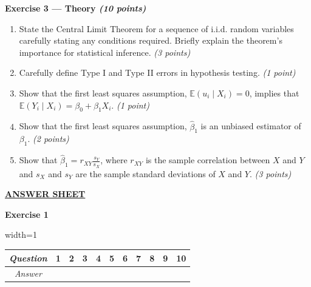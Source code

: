 \documentclass{article}
\begin{document}
\vspace{1cm}
\textbf{Exercise 3 --- Theory \textit{(10 points)}} \\[1em]

\begin{enumerate}[label=\alph*)]

\item State the Central Limit Theorem for a sequence of i.i.d. random
variables carefully stating any conditions required. Briefly explain the
theorem's importance for statistical inference. \textit{(3 points)}

\item Carefully define Type I and Type II errors in hypothesis testing. \textit{(1 point)}

\item Show that the first least squares assumption, $\mathbb{E}(u_i \mid X_i) = 0$, implies that $\mathbb{E}(Y_i\mid X_i) = \beta_0 +\beta_1 X_i$. \textit{(1 point)}

\item Show that the first least squares assumption, $\hat{\beta}_1$ is an unbiased estimator of $\beta_1$. \textit{(2 points)}


\item Show that  $\hat{\beta}_1 = r_{XY}\frac{s_Y}{s_X}$, where $r_{XY}$ is the sample correlation between $X$ and $Y$ and ${s_X}$ and ${s_Y}$ are the sample standard deviations of $X$ and $Y$. \textit{(3 points)}

\end{enumerate}


\newpage
{}

\begin{center}
    \textbf{\Large \underline{ANSWER SHEET}}
\end{center}
\vspace{1cm}

\textbf{Exercise 1}\vspace{.25cm}
\begin{table}[hp!]
\centering
\begin{adjustbox}{width=1\textwidth}
\begin{tabular}{|c|c|c|c|c|c|c|c|c|c|c|}
\hline
\rowcolor[HTML]{EFEFEF} 
\textit{Question} & 1 & 2 & 3 & 4 & 5 & 6 & 7 & 8 & 9 & 10 \\ \hline
\textit{Answer}   &   &   &   &   &   &   &   &   &   &    \\ \hline
\end{tabular}
\end{adjustbox}
\end{table}
\vspace{1cm}
\end{document}
